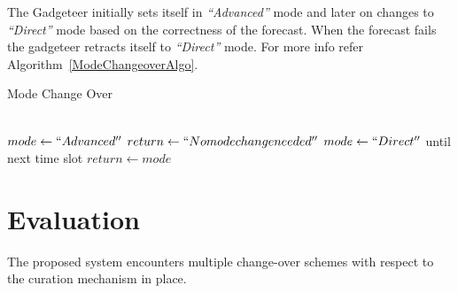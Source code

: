 \documentclass[10pt]{article}
\begin{document}
The Gadgeteer initially sets itself in \emph{``Advanced''} mode and later on changes to \emph{``Direct''} mode based on the correctness of the forecast.
When the forecast fails the gadgeteer retracts itself to \emph{``Direct''} mode. 
For more info refer Algorithm~\ref{ModeChangeoverAlgo}.

\begin{algorithm}
\caption{Mode Change Over}          %
\label{ModeChangeoverAlgo}      
\begin{algorithmic}
\\
\State $mode \gets ``Advanced''$
    \State $return \gets``No mode change needed''$
\Else
    \State $mode \gets ``Direct''$ until next time slot
\EndIf
\State $return \gets mode$
\end{algorithmic}
\end{algorithm} 


\section*{Evaluation}

The proposed system encounters multiple change-over schemes with respect to the curation mechanism in place.\\
\end{document}
